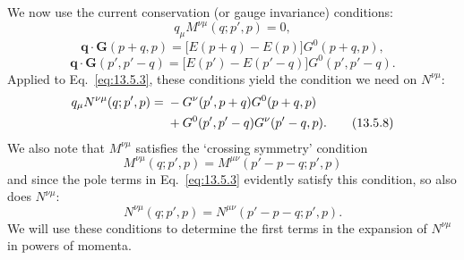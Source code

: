 We now use the current conservation (or gauge invariance) conditions:
\begin{equation}
q_\mu M^{\nu\mu}(q;p',p)=0,
\tag{13.5.5}\label{eq:13.5.5}
\end{equation}
\begin{equation}
\mathbf q\cdot\mathbf G(p+q,p)
=\bigl[E(p+q)-E(p)\bigr]G^0(p+q,p),
\tag{13.5.6}\label{eq:13.5.6}
\end{equation}
\begin{equation}
\mathbf q\cdot\mathbf G(p',p'-q)
=\bigl[E(p')-E(p'-q)\bigr]G^0(p',p'-q).
\tag{13.5.7}\label{eq:13.5.7}
\end{equation}
Applied to Eq.~\eqref{eq:13.5.3}, these conditions yield the condition we need on
$N^{\nu\mu}$:
\begin{align}
q_\mu N^{\nu\mu}(q;p',p)={}&-G^\nu(p',p+q)G^0(p+q,p)
\notag\\
&+G^0(p',p'-q)G^\nu(p'-q,p).
\tag{13.5.8}\label{eq:13.5.8}
\end{align}
We also note that $M^{\nu\mu}$ satisfies the `crossing symmetry' condition
\begin{equation}
M^{\nu\mu}(q;p',p)=M^{\mu\nu}(p'-p-q;p',p)
\tag{13.5.9}\label{eq:13.5.9}
\end{equation}
and since the pole terms in Eq.~\eqref{eq:13.5.3} evidently satisfy this condition, so
also does $N^{\nu\mu}$:
\begin{equation}
N^{\nu\mu}(q;p',p)=N^{\mu\nu}(p'-p-q;p',p).
\tag{13.5.10}\label{eq:13.5.10}
\end{equation}
We will use these conditions to determine the first terms in the expansion
of $N^{\nu\mu}$ in powers of momenta.

